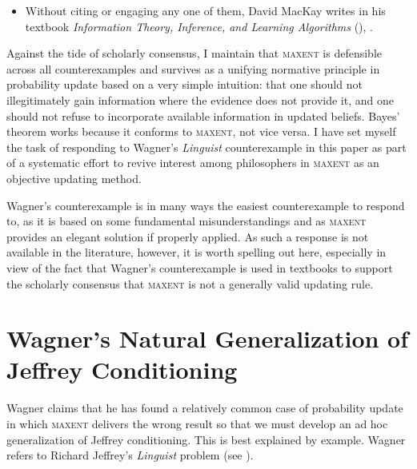 \documentclass[11pt]{article}
\begin{document}
\begin{itemize}
\item Without citing or engaging any one of them, David MacKay writes
  in his textbook \emph{Information Theory, Inference, and Learning
    Algorithms} (),  .
\end{itemize}

Against the tide of scholarly consensus, I maintain that
\textsc{maxent} is defensible across all counterexamples and survives
as a unifying normative principle in probability update based on a
very simple intuition: that one should not illegitimately gain
information where the evidence does not provide it, and one should not
refuse to incorporate available information in updated beliefs. Bayes'
theorem works because it conforms to \textsc{maxent}, not vice versa.
I have set myself the task of responding to Wagner's
\emph{Linguist} counterexample in this paper as part of a
systematic effort to revive interest among philosophers in
\textsc{maxent} as an objective updating method.

Wagner's counterexample is in many ways the easiest counterexample to
respond to, as it is based on some fundamental misunderstandings and
as \textsc{maxent} provides an elegant solution if
properly applied. As such a response is not available in the
literature, however, it is worth spelling out here, especially in view
of the fact that Wagner's counterexample is used in textbooks to
support the scholarly consensus that \textsc{maxent}
is not a generally valid updating rule.

\section{Wagner's Natural Generalization of Jeffrey Conditioning}
\label{NatGen}

Wagner claims that he has found a relatively common case of
probability update in which \textsc{maxent} delivers the wrong result
so that we must develop an ad hoc generalization of Jeffrey
conditioning. This is best explained by example. Wagner refers to
Richard Jeffrey's \emph{Linguist} problem (see
).
\end{document}
